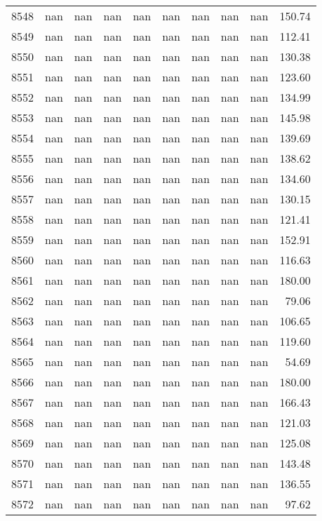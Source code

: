 \begin{tabular}{lrrrrrrrrr}
8548 & nan & nan & nan & nan & nan & nan & nan & nan & 150.74 \\
8549 & nan & nan & nan & nan & nan & nan & nan & nan & 112.41 \\
8550 & nan & nan & nan & nan & nan & nan & nan & nan & 130.38 \\
8551 & nan & nan & nan & nan & nan & nan & nan & nan & 123.60 \\
8552 & nan & nan & nan & nan & nan & nan & nan & nan & 134.99 \\
8553 & nan & nan & nan & nan & nan & nan & nan & nan & 145.98 \\
8554 & nan & nan & nan & nan & nan & nan & nan & nan & 139.69 \\
8555 & nan & nan & nan & nan & nan & nan & nan & nan & 138.62 \\
8556 & nan & nan & nan & nan & nan & nan & nan & nan & 134.60 \\
8557 & nan & nan & nan & nan & nan & nan & nan & nan & 130.15 \\
8558 & nan & nan & nan & nan & nan & nan & nan & nan & 121.41 \\
8559 & nan & nan & nan & nan & nan & nan & nan & nan & 152.91 \\
8560 & nan & nan & nan & nan & nan & nan & nan & nan & 116.63 \\
8561 & nan & nan & nan & nan & nan & nan & nan & nan & 180.00 \\
8562 & nan & nan & nan & nan & nan & nan & nan & nan & 79.06 \\
8563 & nan & nan & nan & nan & nan & nan & nan & nan & 106.65 \\
8564 & nan & nan & nan & nan & nan & nan & nan & nan & 119.60 \\
8565 & nan & nan & nan & nan & nan & nan & nan & nan & 54.69 \\
8566 & nan & nan & nan & nan & nan & nan & nan & nan & 180.00 \\
8567 & nan & nan & nan & nan & nan & nan & nan & nan & 166.43 \\
8568 & nan & nan & nan & nan & nan & nan & nan & nan & 121.03 \\
8569 & nan & nan & nan & nan & nan & nan & nan & nan & 125.08 \\
8570 & nan & nan & nan & nan & nan & nan & nan & nan & 143.48 \\
8571 & nan & nan & nan & nan & nan & nan & nan & nan & 136.55 \\
8572 & nan & nan & nan & nan & nan & nan & nan & nan & 97.62 \\

\end{tabular}
